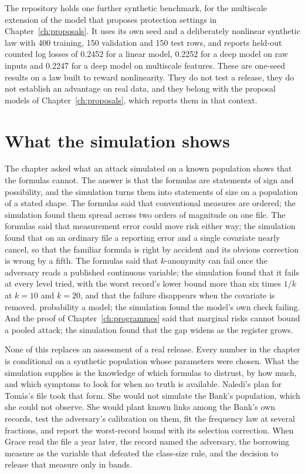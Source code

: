 The repository holds one further synthetic benchmark, for the multiscale extension
of the model that proposes protection settings in Chapter~\ref{ch:proposals}. It
uses its own seed and a deliberately nonlinear synthetic law with 400 training, 150
validation and 150 test rows, and reports held-out counted log losses of 0.2452 for a
linear model, 0.2252 for a deep model on raw inputs and 0.2247 for a deep model on
multiscale features.
These are one-seed results on a law built to reward nonlinearity. They do not test a
release, they do not establish an advantage on real data, and they belong with the
proposal models of Chapter~\ref{ch:proposals}, which reports them in that context.

\section{What the simulation shows}

The chapter asked what an attack simulated on a known population shows that the
formulas cannot. The answer is that the formulas are statements of sign and
possibility, and the simulation turns them into statements of size on a population
of a stated shape. The formulas said that conventional measures are ordered; the
simulation found them spread across two orders of magnitude on one file. The
formulas said that measurement error could move risk either way; the simulation
found that on an ordinary file a reporting error and a single covariate nearly
cancel, so that the familiar formula is right by accident and its obvious correction
is wrong by a fifth. The formulas said that $k$-anonymity can fail once the adversary
reads a published continuous variable; the simulation found that it fails at every
level tried, with the worst record's lower bound more than six times $1/k$ at
$k = 10$ and $k = 20$, and that the failure disappears when the covariate is
removed.
probability a model; the simulation found the model's own check failing. And the
proof of Chapter~\ref{ch:programmes} said that marginal risks cannot bound a pooled
attack; the simulation found that the gap widens as the register grows.

None of this replaces an assessment of a real release. Every number in the chapter is
conditional on a synthetic population whose parameters were chosen. What the
simulation supplies is the knowledge of which formulas to distrust, by how much, and
which symptoms to look for when no truth is available. Naledi's plan for Tomás's file
took that form. She would not simulate the Bank's population, which she could not
observe. She would plant known links among the Bank's own records, test the
adversary's calibration on them, fit the frequency law at several fractions, and
report the worst-record bound with its selection correction. When Grace read the file
a year later, the record named the adversary, the borrowing measure as the variable
that defeated the class-size rule, and the decision to release that measure only in
bands.

